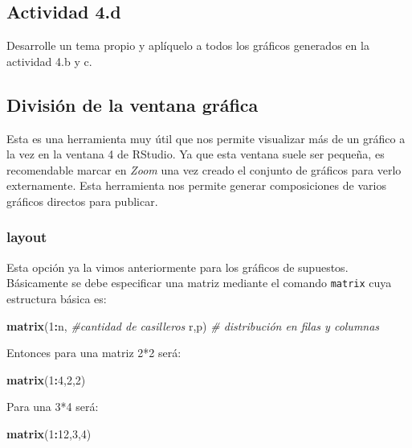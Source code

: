 \documentclass[
]{article}
\newenvironment{Shaded}{\begin{snugshade}}{\end{snugshade}}
\newcommand{\CommentTok}[1]{\textcolor[rgb]{0.56,0.35,0.01}{\textit{#1}}}
\newcommand{\DecValTok}[1]{\textcolor[rgb]{0.00,0.00,0.81}{#1}}
\newcommand{\FunctionTok}[1]{\textcolor[rgb]{0.13,0.29,0.53}{\textbf{#1}}}
\newcommand{\NormalTok}[1]{#1}
\newcommand{\SpecialCharTok}[1]{\textcolor[rgb]{0.81,0.36,0.00}{\textbf{#1}}}
\begin{document}
\subsection{Actividad 4.d}\label{actividad-4.d}

Desarrolle un tema propio y aplíquelo a todos los gráficos generados en
la actividad 4.b y c.

\subsection{División de la ventana
gráfica}\label{divisiuxf3n-de-la-ventana-gruxe1fica}

Esta es una herramienta muy útil que nos permite visualizar más de un
gráfico a la vez en la ventana 4 de RStudio. Ya que esta ventana suele
ser pequeña, es recomendable marcar en \emph{Zoom} una vez creado el
conjunto de gráficos para verlo externamente. Esta herramienta nos
permite generar composiciones de varios gráficos directos para publicar.

\subsubsection{layout}\label{layout}

Esta opción ya la vimos anteriormente para los gráficos de supuestos.
Básicamente se debe especificar una matriz mediante el comando
\texttt{matrix} cuya estructura básica es:

\begin{Shaded}
\begin{Highlighting}[]
\FunctionTok{matrix}\NormalTok{(}\DecValTok{1}\SpecialCharTok{:}\NormalTok{n, }\CommentTok{\#cantidad de casilleros}
\NormalTok{       r,p) }\CommentTok{\# distribución en filas y columnas}
\end{Highlighting}
\end{Shaded}

Entonces para una matriz 2*2 será:

\begin{Shaded}
\begin{Highlighting}[]
\FunctionTok{matrix}\NormalTok{(}\DecValTok{1}\SpecialCharTok{:}\DecValTok{4}\NormalTok{,}\DecValTok{2}\NormalTok{,}\DecValTok{2}\NormalTok{)}
\end{Highlighting}
\end{Shaded}

Para una 3*4 será:

\begin{Shaded}
\begin{Highlighting}[]
\FunctionTok{matrix}\NormalTok{(}\DecValTok{1}\SpecialCharTok{:}\DecValTok{12}\NormalTok{,}\DecValTok{3}\NormalTok{,}\DecValTok{4}\NormalTok{)}
\end{Highlighting}
\end{Shaded}
\end{document}
